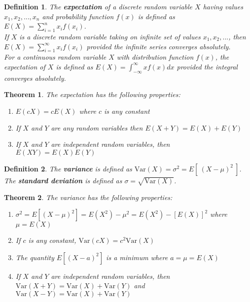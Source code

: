 \documentclass[14pt,twoside]{extreport}
\theoremstyle{dotless}
\newtheorem*{defn}{Definition}
\newtheorem*{thm}{Theorem} %
\begin{document}
\begin{defn}
    The \textbf{expectation} of a discrete random variable $X$ having values $x_1, x_2, ..., x_n$ and probability function $f(x)$ is defined as $E\left (X\right ) = \sum_{i=1}^n x_i f\left (x_i\right )$.
    \\

    If $X$ is a discrete random variable taking on infinite set of values $x_1, x_2, ...$, then $E(X) = \sum_{i=1}^\infty x_i f(x_i)$ provided the infinite series converges absolutely.
    \\

    For a continuous random variable $X$ with distribution function $f(x)$, the expectation of $X$ is defined as $E(X) = \int_{- \infty}^\infty x f(x) dx$ provided the integral converges absolutely.
\end{defn}


\begin{samepage}
\begin{thm}
    The expectation has the following properties:

    \begin{enumerate}
        \item $E(c X) = c E(X)$ where $c$ is any constant
        \item If $X$ and $Y$ are any random variables then $E(X + Y) = E(X) + E(Y)$
        \item If $X$ and $Y$ are independent random variables, then $E(XY) = E(X)E(Y)$
    \end{enumerate}
\end{thm}
\end{samepage}

\begin{defn}
    The \textbf{variance} is defined as $\text{Var} (X) = \sigma ^2 = E[ \  (X - \mu)^2 \  ]$.
    The \textbf{standard deviation} is defined as $\sigma = \sqrt{\text{Var} (X)}$.
\end{defn}

\begin{samepage}
\begin{thm}
    The variance has the following properties:

    \begin{enumerate}
        \item $\sigma ^2 = E\left [ \left (X - \mu \right ) ^2 \right ] = E\left (X ^2\right ) - \mu ^2 = E\left (X ^2\right ) - \left [E\left (X\right )\right ] ^2$ where $\mu = E\left (X\right )$
        \item If $c$ is any constant, $\text{Var}(cX) = c^2 \text{Var}(X)$
        \item The quantity $E[ (X - a)^2 ]$ is a minimum where $a = \mu = E(X)$
        \item If $X$ and $Y$ are independent random variables, then \\ $\text{Var}(X+Y) = \text{Var}(X) + \text{Var}(Y)$ and $\text{Var}(X-Y) = \text{Var}(X) + \text{Var}(Y)$
    \end{enumerate}
\end{thm}
\end{samepage}
\end{document}
